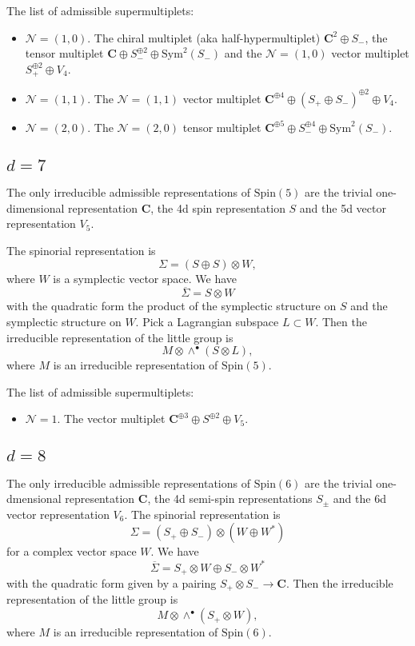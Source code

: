 \documentclass[12pt]{amsart}
\newcommand{\C}{\mathbf{C}}
\newcommand{\cN}{\mathcal{N}}
\newcommand{\Spin}{\mathrm{Spin}}
\newcommand{\Sym}{\mathrm{Sym}}
\theoremstyle{definition}
\theoremstyle{remark}
\begin{document}
The list of admissible supermultiplets:
\begin{itemize}
\item $\cN=(1, 0)$. The chiral multiplet (aka half-hypermultiplet) $\C^2\oplus S_-$, the tensor multiplet $\C\oplus S_-^{\oplus 2}\oplus \Sym^2(S_-)$ and the $\cN=(1, 0)$ vector multiplet $S_+^{\oplus 2}\oplus V_4$.

\item $\cN=(1, 1)$. The $\cN=(1, 1)$ vector multiplet $\C^{\oplus 4}\oplus (S_+\oplus S_-)^{\oplus 2}\oplus V_4$.

\item $\cN=(2, 0)$. The $\cN=(2, 0)$ tensor multiplet $\C^{\oplus 5}\oplus S_-^{\oplus 4}\oplus \Sym^2(S_-)$.
\end{itemize}

\subsection{$d=7$}

The only irreducible admissible representations of $\Spin(5)$ are the trivial one-dimensional representation $\C$, the 4d spin representation $S$ and the 5d vector representation $V_5$.

The spinorial representation is
\[\Sigma = (S\oplus S)\otimes W,\]
where $W$ is a symplectic vector space. We have
\[\overline{\Sigma} = S\otimes W\]
with the quadratic form the product of the symplectic structure on $S$ and the symplectic structure on $W$. Pick a Lagrangian subspace $L\subset W$. Then the irreducible representation of the little group is
\[M\otimes \wedge^\bullet(S\otimes L),\]
where $M$ is an irreducible representation of $\Spin(5)$.

The list of admissible supermultiplets:
\begin{itemize}
\item $\cN=1$. The vector multiplet $\C^{\oplus 3}\oplus S^{\oplus 2}\oplus V_5$.
\end{itemize}

\subsection{$d=8$}

The only irreducible admissible representations of $\Spin(6)$ are the trivial one-dmensional representation $\C$, the 4d semi-spin representations $S_{\pm}$ and the 6d vector representation $V_6$. The spinorial representation is
\[\Sigma=(S_+\oplus S_-)\otimes (W\oplus W^*)\]
for a complex vector space $W$. We have
\[\overline{\Sigma} = S_+\otimes W\oplus S_-\otimes W^*\]
with the quadratic form given by a pairing $S_+\otimes S_-\rightarrow \C$. Then the irreducible representation of the little group is
\[M\otimes \wedge^\bullet(S_+\otimes W),\]
where $M$ is an irreducible representation of $\Spin(6)$.
\end{document}
